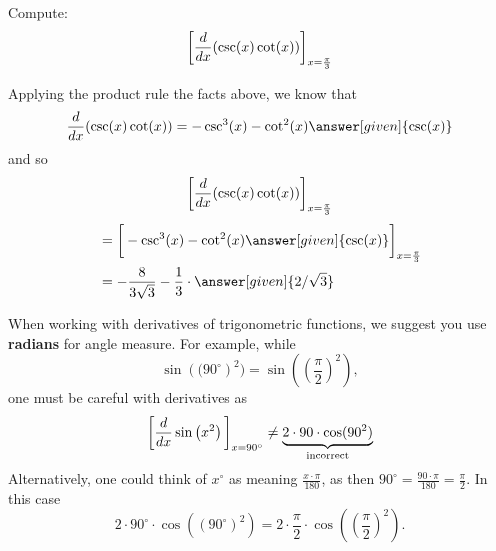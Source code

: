 \documentclass{ximera}
\begin{document}
\begin{example}
Compute:
\[
\bigg[ \frac{d}{dx} ( \csc(x) \cot(x) ) \bigg]_{x=\frac{\pi}{3}}
\]
\begin{explanation}
Applying the product rule the facts above, we know that
\[
\frac{d}{dx} ( \csc(x) \cot(x) ) = - \csc^3(x) - \cot^2(x)\answer[given]{\csc(x)}
\]
and so
\[
\bigg[ \frac{d}{dx} ( \csc(x) \cot(x) ) \bigg]_{x=\frac{\pi}{3}}
\]
\begin{align*}
  &= \eval{  - \csc^3(x) - \cot^2(x) \answer[given]{\csc(x)}}_{x=\frac{\pi}{3}}  \\
&= - \frac{8}{3 \sqrt{3}} - \frac{1}{3}\cdot \answer[given]{2/\sqrt{3}}
\end{align*}
\end{explanation}
\end{example}


\begin{warning}
When working with derivatives of trigonometric functions, we suggest
you use \textbf{radians} for angle measure. For example, while
\[
\sin\left((90^\circ\right)^2) = \sin\left(\left(\frac{\pi}{2}\right)^2\right),
\]
one must be careful with derivatives as
\[
\bigg[ \frac{d}{dx} \sin\left(x^2\right) \bigg]_{x=90^\circ} \ne \underbrace{2\cdot 90\cdot \cos(90^2)}_{\text{incorrect}}
\]
Alternatively, one could think of $x^\circ$ as meaning
$\frac{x\cdot\pi}{180}$, as then $90^\circ = \frac{90\cdot\pi}{180} =
\frac{\pi}{2}$. In this case
\[
2\cdot 90^\circ\cdot \cos((90^\circ)^2) = 2\cdot \frac{\pi}{2}\cdot\cos\left(\left(\frac{\pi}{2}\right)^2\right).
\]
\end{warning}
\end{document}
